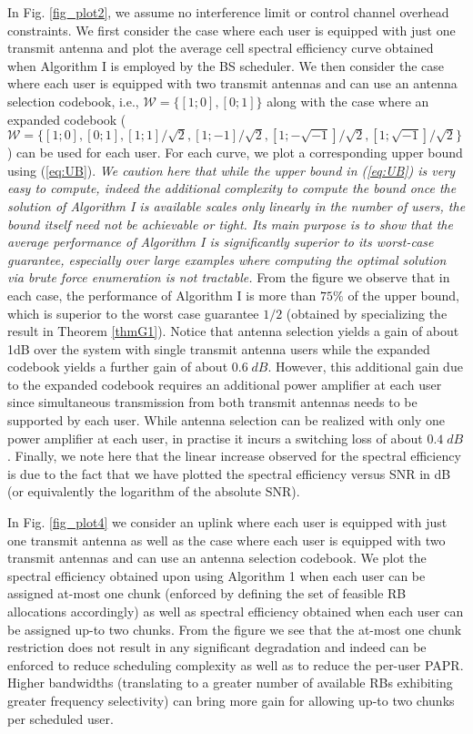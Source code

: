 \documentclass[11pt] {article}
\newcommand{\Wc} {{\mathcal W}}         \newcommand{\Wk} {{\bm {\mathcal W}}}
\begin{document}
   In Fig. \ref{fig_plot2}, we assume no interference limit or control channel overhead constraints. We first  consider the case where each user is equipped with just one transmit antenna
    and plot the average cell spectral efficiency curve  obtained   when Algorithm I is employed by the BS scheduler. We then consider the case where
    each user is equipped with two transmit antennas and can use an antenna  selection codebook, i.e., $\Wc=\{[1;0],[0;1]\}$ along with the case where an expanded codebook ($\Wc=\{[1;0],[0;1],[1;1]/\sqrt{2},[1;-1]/\sqrt{2},[1;-\sqrt{-1}]/\sqrt{2},[1;\sqrt{-1}]/\sqrt{2}\}$ \cite{3gpp}) can be used for each user. For each curve, we plot a corresponding upper bound using (\ref{eq:UB}).  {\em We caution here that while the upper bound in (\ref{eq:UB}) is very easy to compute, indeed the additional complexity to compute the bound once the solution of Algorithm I is available scales only linearly in the number of users, the bound itself need not be achievable or tight. Its main purpose is to show that the average performance of Algorithm I is significantly superior to its worst-case guarantee, especially over large examples where computing the optimal solution via brute force enumeration is not tractable.} From the figure we observe that in each case, the performance of Algorithm I  is more than $75 \%$ of the  upper bound, which is   superior to the worst case guarantee $1/2$ (obtained by specializing the result in Theorem \ref{thmG1}). Notice that  antenna selection yields a gain of about 1dB over the system with single transmit antenna users while the expanded codebook yields a further gain of about $0.6 \;dB$. However, this additional gain due to the expanded codebook requires an additional power amplifier at each user since simultaneous transmission from both transmit antennas needs to be supported by each user. While antenna selection can be realized with only one power amplifier at each user, in practise it  incurs a switching loss of about $0.4\;dB$. Finally, we note here that the linear increase observed for the spectral efficiency is due to the fact that we have plotted the spectral efficiency versus SNR in dB (or equivalently the logarithm of the absolute SNR).


 In Fig. \ref{fig_plot4} we consider an uplink where each user is equipped with just one transmit antenna
    as well as the case where
    each user is equipped with two transmit antennas and can use an antenna  selection codebook.  We   plot the spectral efficiency obtained upon using Algorithm 1 when each user can be assigned at-most one chunk (enforced by defining the set of feasible RB allocations accordingly) as well as spectral efficiency obtained when each user can be assigned up-to two chunks. From the figure we see that the at-most one chunk restriction does not result in any significant degradation and indeed can be enforced to reduce scheduling complexity as well as to reduce the per-user PAPR. Higher bandwidths (translating to a greater number of available RBs exhibiting greater frequency selectivity) can bring more gain for allowing up-to two chunks per scheduled user.
\end{document}

